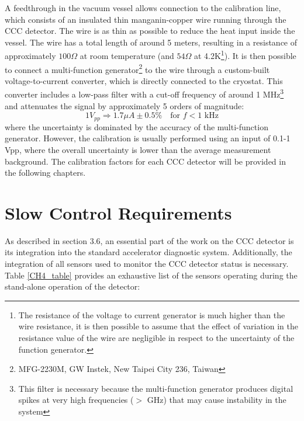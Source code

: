\documentclass[12pt,a4paper]{report}
\begin{document}
       A feedthrough in the vacuum vessel allows connection to the calibration line, which consists of an insulated thin manganin-copper wire running through the CCC detector. The wire is as thin as possible to reduce the heat input inside the vessel. The wire has a total length of around 5 meters, resulting in a resistance of approximately $100 \Omega$ at room temperature (and $54 \Omega$ at 4.2K\footnote{The resistance of the voltage to current generator is much higher than the wire resistance, it is then possible to assume that the effect of variation in the resistance value of the wire are negligible in respect to the uncertainty of the function generator.}). It is then possible to connect a multi-function generator\footnote{MFG-2230M, GW Instek, New Taipei City 236, Taiwan} to the wire through a custom-built voltage-to-current converter, which is directly connected to the cryostat. This converter includes a low-pass filter with a cut-off frequency of around 1 MHz\footnote{This filter is necessary because the multi-function generator produces digital spikes at very high frequencies ($>$ GHz) that may cause instability in the system} and attenuates the signal by approximately 5 orders of magnitude:
       \begin{equation}
       	1 V_{pp} \Rightarrow 1.7 \mu A \pm 0.5 \% \quad \text{for } f<1 \text{ kHz}
       \end{equation}
       where the uncertainty is dominated by the accuracy of the multi-function generator. However, the calibration is usually performed using an input of 0.1-1 Vpp, where the overall uncertainty is lower than the average measurement background. The calibration factors for each CCC detector will be provided in the following chapters.
       
       \section{Slow Control Requirements}
       As described in section 3.6, an essential part of the work on the CCC detector is its integration into the standard accelerator diagnostic system. Additionally, the integration of all sensors used to monitor the CCC detector status is necessary. Table \ref{CH4_table} provides an exhaustive list of the sensors operating during the stand-alone operation of the detector:
       
\end{document}
